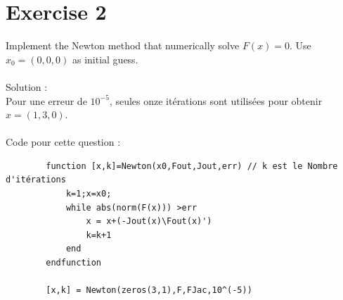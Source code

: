 \documentclass[11pt]{article}
\begin{document}
    \section*{Exercise 2}
    Implement the Newton method that numerically solve $F(x) = 0$. Use $x_0 =(0,0,0)$ as initial guess.\\
    ~\\
    Solution : \\
    Pour une erreur de $10^{-5}$, seules onze itérations sont utilisées pour obtenir $x=(1,3,0)$.\\
    ~\\
    Code pour cette question :
    \begin{verbatim}
        function [x,k]=Newton(x0,Fout,Jout,err) // k est le Nombre d'itérations
            k=1;x=x0;
            while abs(norm(F(x))) >err
                x = x+(-Jout(x)\Fout(x)')
                k=k+1
            end
        endfunction

        [x,k] = Newton(zeros(3,1),F,FJac,10^(-5))
    \end{verbatim}
    ~\\
\end{document}
